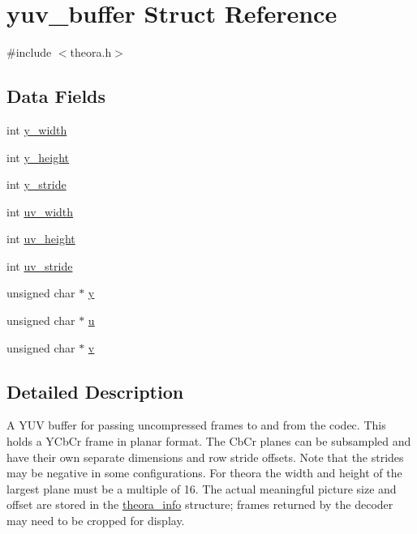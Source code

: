\hypertarget{structyuv__buffer}{}\section{yuv\+\_\+buffer Struct Reference}
\label{structyuv__buffer}


{\ttfamily \#include $<$theora.\+h$>$}

\subsection*{Data Fields}
\begin{DoxyCompactItemize}
\item 
int \hyperlink{structyuv__buffer_aaa6c06c071da933231647238418d5fc0}{y\+\_\+width}
\item 
int \hyperlink{structyuv__buffer_a5a8b60e012247e2caffcbbaca99414e0}{y\+\_\+height}
\item 
int \hyperlink{structyuv__buffer_a9cdf61834c11b2351640a4a243ad0549}{y\+\_\+stride}
\item 
int \hyperlink{structyuv__buffer_a8c59a57c35af0be519ee47f15e49fe2b}{uv\+\_\+width}
\item 
int \hyperlink{structyuv__buffer_a640f1a0b456d3807f9f0538b22f10097}{uv\+\_\+height}
\item 
int \hyperlink{structyuv__buffer_ab265cc24ffb5650bf52daf223b0debb9}{uv\+\_\+stride}
\item 
unsigned char $\ast$ \hyperlink{structyuv__buffer_a725727c70eeced6b8c90866973399ac1}{y}
\item 
unsigned char $\ast$ \hyperlink{structyuv__buffer_a8b1857afe3ffac28f259499a57a559e1}{u}
\item 
unsigned char $\ast$ \hyperlink{structyuv__buffer_aa429491dd112adb0254672c59ef55075}{v}
\end{DoxyCompactItemize}


\subsection{Detailed Description}
A Y\+UV buffer for passing uncompressed frames to and from the codec. This holds a Y\textquotesingle{}Cb\+Cr frame in planar format. The Cb\+Cr planes can be subsampled and have their own separate dimensions and row stride offsets. Note that the strides may be negative in some configurations. For theora the width and height of the largest plane must be a multiple of 16. The actual meaningful picture size and offset are stored in the \hyperlink{structtheora__info}{theora\+\_\+info} structure; frames returned by the decoder may need to be cropped for display.

